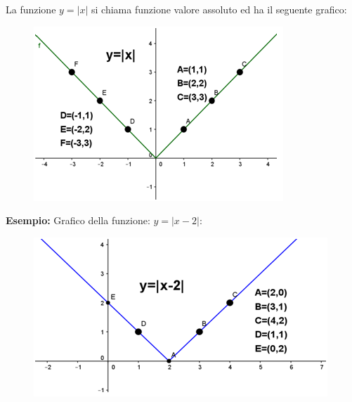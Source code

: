 La funzione $y=|x|$ si chiama funzione valore assoluto ed ha il seguente 
grafico:

\begin{figure}[h]
\begin{center}
\begin{inaccessibleblock}[TODO]
\includegraphics[width=0.6\linewidth]{img/imm2} %
\end{inaccessibleblock}
\label{fig:abs_imm2}
\end{center}
\end{figure}

\textbf{Esempio: } Grafico della funzione: $y=|x-2|$:

\begin{figure}[h]
\begin{center}
\begin{inaccessibleblock}[TODO]
\centering
\includegraphics[width=0.6\linewidth]{img/imm3} %
\end{inaccessibleblock}
\label{fig:abs_imm3}
\end{center}
\end{figure}

